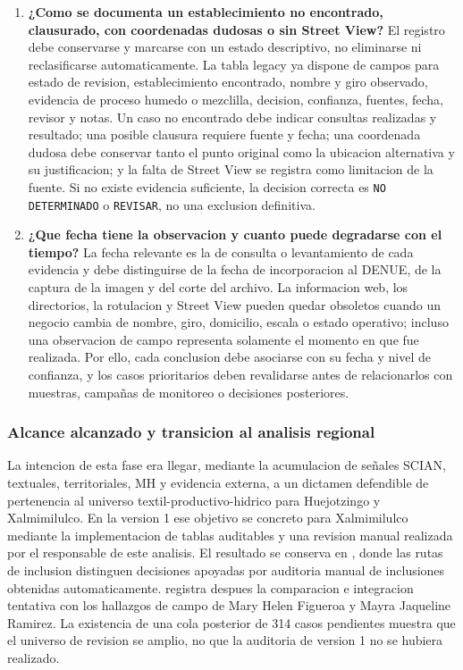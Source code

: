 \documentclass[11pt,letterpaper]{article}
\begin{document}
\begin{enumerate}
    \item \textbf{¿Como se documenta un establecimiento no encontrado, clausurado, con coordenadas dudosas o sin Street View?}
    El registro debe conservarse y marcarse con un estado descriptivo, no eliminarse ni reclasificarse automaticamente. La tabla legacy ya dispone de campos para estado de revision, establecimiento encontrado, nombre y giro observado, evidencia de proceso humedo o mezclilla, decision, confianza, fuentes, fecha, revisor y notas. Un caso no encontrado debe indicar consultas realizadas y resultado; una posible clausura requiere fuente y fecha; una coordenada dudosa debe conservar tanto el punto original como la ubicacion alternativa y su justificacion; y la falta de Street View se registra como limitacion de la fuente. Si no existe evidencia suficiente, la decision correcta es \texttt{NO DETERMINADO} o \texttt{REVISAR}, no una exclusion definitiva.

    \item \textbf{¿Que fecha tiene la observacion y cuanto puede degradarse con el tiempo?}
    La fecha relevante es la de consulta o levantamiento de cada evidencia y debe distinguirse de la fecha de incorporacion al DENUE, de la captura de la imagen y del corte del archivo. La informacion web, los directorios, la rotulacion y Street View pueden quedar obsoletos cuando un negocio cambia de nombre, giro, domicilio, escala o estado operativo; incluso una observacion de campo representa solamente el momento en que fue realizada. Por ello, cada conclusion debe asociarse con su fecha y nivel de confianza, y los casos prioritarios deben revalidarse antes de relacionarlos con muestras, campañas de monitoreo o decisiones posteriores.
\end{enumerate}

\subsubsection*{Alcance alcanzado y transicion al analisis regional}

La intencion de esta fase era llegar, mediante la acumulacion de señales SCIAN, textuales, territoriales, MH y evidencia externa, a un dictamen defendible de pertenencia al universo textil-productivo-hidrico para Huejotzingo y Xalmimilulco. En la version 1 ese objetivo se concreto para Xalmimilulco mediante la implementacion de tablas auditables y una revision manual realizada por el responsable de este analisis. El resultado se conserva en , donde las rutas de inclusion distinguen decisiones apoyadas por auditoria manual de inclusiones obtenidas automaticamente.  registra despues la comparacion e integracion tentativa con los hallazgos de campo de Mary Helen Figueroa y Mayra Jaqueline Ramirez. La existencia de una cola posterior de 314 casos pendientes muestra que el universo de revision se amplio, no que la auditoria de version 1 no se hubiera realizado.
\end{document}
